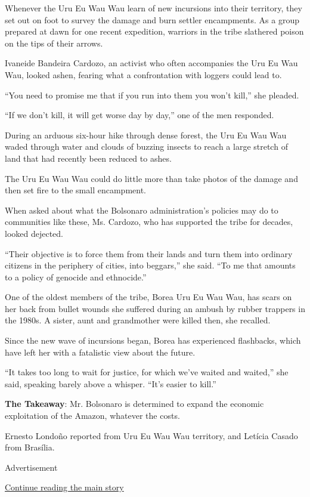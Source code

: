 Whenever the Uru Eu Wau Wau learn of new incursions into their
territory, they set out on foot to survey the damage and burn settler
encampments. As a group prepared at dawn for one recent expedition,
warriors in the tribe slathered poison on the tips of their arrows.

Ivaneide Bandeira Cardozo, an activist who often accompanies the Uru Eu
Wau Wau, looked ashen, fearing what a confrontation with loggers could
lead to.

``You need to promise me that if you run into them you won't kill,'' she
pleaded.

``If we don't kill, it will get worse day by day,'' one of the men
responded.

During an arduous six-hour hike through dense forest, the Uru Eu Wau Wau
waded through water and clouds of buzzing insects to reach a large
stretch of land that had recently been reduced to ashes.

The Uru Eu Wau Wau could do little more than take photos of the damage
and then set fire to the small encampment.

When asked about what the Bolsonaro administration's policies may do to
communities like these, Ms. Cardozo, who has supported the tribe for
decades, looked dejected.

``Their objective is to force them from their lands and turn them into
ordinary citizens in the periphery of cities, into beggars,'' she said.
``To me that amounts to a policy of genocide and ethnocide.''

One of the oldest members of the tribe, Borea Uru Eu Wau Wau, has scars
on her back from bullet wounds she suffered during an ambush by rubber
trappers in the 1980s. A sister, aunt and grandmother were killed then,
she recalled.

Since the new wave of incursions began, Borea has experienced
flashbacks, which have left her with a fatalistic view about the future.

``It takes too long to wait for justice, for which we've waited and
waited,'' she said, speaking barely above a whisper. ``It's easier to
kill.''

\textbf{The Takeaway}: Mr. Bolsonaro is determined to expand the
economic exploitation of the Amazon, whatever the costs.

Ernesto Londoño reported from Uru Eu Wau Wau territory, and Letícia
Casado from Brasília.

Advertisement

\protect\hyperlink{after-bottom}{Continue reading the main story}

